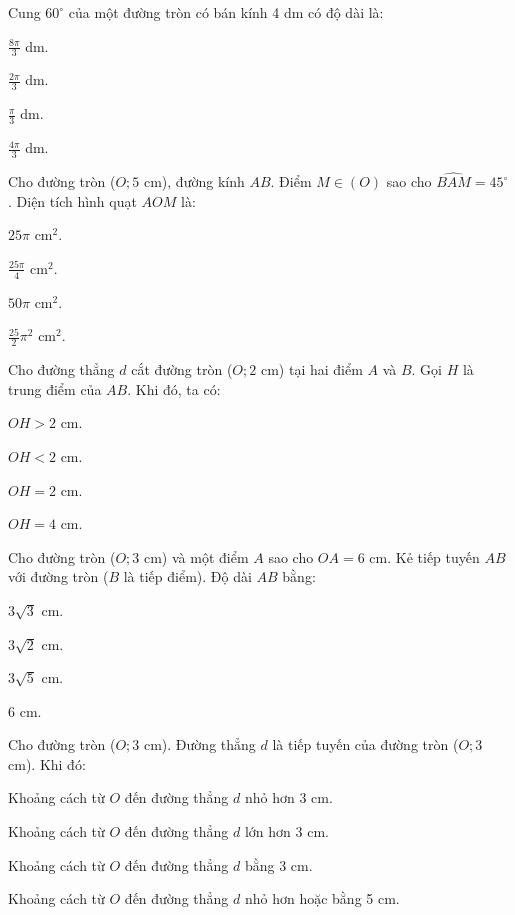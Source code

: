 \documentclass[%
    fontsize=12pt,%
    chapterprefix=false,%
    open=right,%
    twoside=false,%
    numbers=noenddot,%
    headings=optiontohead,%
    final,%
    DIV=15,%
    parskip=half %
]{scrbook}
\begin{document}
\begin{tracnghiem}
\item Cung $60^\circ$ của một đường tròn có bán kính 4 dm có độ dài là:
\begin{options}
  \item $\frac{8\pi}{3}$ dm.
  \item $\frac{2\pi}{3}$ dm.
  \item $\frac{\pi}{3}$ dm.
  \item $\frac{4\pi}{3}$ dm.
\end{options}

\item Cho đường tròn ($O; 5$ cm), đường kính $AB$. Điểm $M \in (O)$ sao cho $\widehat{BAM} = 45^\circ$. Diện tích hình quạt $AOM$ là:
\begin{options}
  \item $25\pi$ cm$^2$.
  \item $\frac{25\pi}{4}$ cm$^2$.
  \item $50\pi$ cm$^2$.
  \item $\frac{25}{2}\pi^2$ cm$^2$.
\end{options}

\item Cho đường thẳng $d$ cắt đường tròn ($O; 2$ cm) tại hai điểm $A$ và $B$. Gọi $H$ là trung điểm của $AB$. Khi đó, ta có:
\begin{options}
  \item $OH > 2$ cm.
  \item $OH < 2$ cm.
  \item $OH = 2$ cm.
  \item $OH = 4$ cm.
\end{options}

\item Cho đường tròn ($O; 3$ cm) và một điểm $A$ sao cho $OA = 6$ cm. Kẻ tiếp tuyến $AB$ với đường tròn ($B$ là tiếp điểm). Độ dài $AB$ bằng:
\begin{options}
  \item $3\sqrt{3}$ cm.
  \item $3\sqrt{2}$ cm.
  \item $3\sqrt{5}$ cm.
  \item 6 cm.
\end{options}

\item Cho đường tròn ($O; 3$ cm). Đường thẳng $d$ là tiếp tuyến của đường tròn ($O; 3$ cm). Khi đó:
\begin{options}
  \item Khoảng cách từ $O$ đến đường thẳng $d$ nhỏ hơn 3 cm.
  \item Khoảng cách từ $O$ đến đường thẳng $d$ lớn hơn 3 cm.
  \item Khoảng cách từ $O$ đến đường thẳng $d$ bằng 3 cm.
  \item Khoảng cách từ $O$ đến đường thẳng $d$ nhỏ hơn hoặc bằng 5 cm.
\end{options}


\end{tracnghiem}
\end{document}
